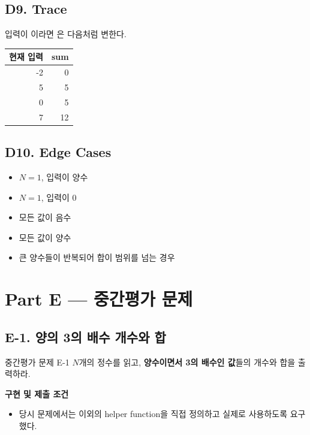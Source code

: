 \subsection*{D9. Trace}
입력이 이라면 은 다음처럼 변한다.
\begin{center}
\begin{tabular}{rr}
\toprule
현재 입력 & sum \\
\midrule
-2 & 0 \\
5 & 5 \\
0 & 5 \\
7 & 12 \\
\bottomrule
\end{tabular}
\end{center}

\subsection*{D10. Edge Cases}
\begin{itemize}
  \item $N=1$, 입력이 양수
  \item $N=1$, 입력이 0
  \item 모든 값이 음수
  \item 모든 값이 양수
  \item 큰 양수들이 반복되어 합이  범위를 넘는 경우
\end{itemize}

\section{Part E --- 중간평가 문제}

\subsection{E-1. 양의 3의 배수 개수와 합}
\begin{problembox}{중간평가 문제 E-1}
$N$개의 정수를 읽고, \textbf{양수이면서 3의 배수인 값}들의 개수와 합을 출력하라.

\textbf{구현 및 제출 조건}
\begin{itemize}
  \item 당시 문제에서는  이외의 helper function을 직접 정의하고 실제로 사용하도록 요구했다.
\end{itemize}
\end{problembox}

